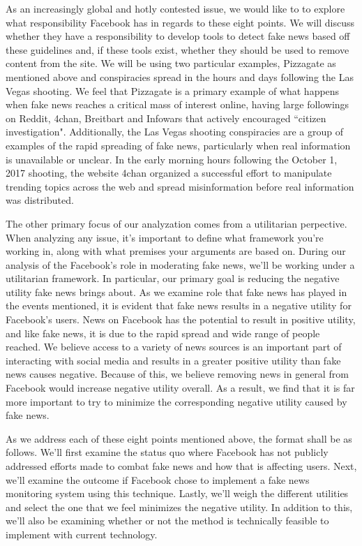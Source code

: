 \documentclass[12pt]{article}
\begin{document}
As an increasingly global and hotly contested issue, we would like to to explore what responsibility Facebook has in regards to these eight points. We will discuss whether they have a responsibility to develop tools to detect fake news based off these guidelines and, if these tools exist, whether they should be used to remove content from the site. We will be using two particular examples, Pizzagate as mentioned above and conspiracies spread in the hours and days following the Las Vegas shooting. We feel that Pizzagate is a primary example of what happens when fake news reaches a critical mass of interest online, having large followings on Reddit, 4chan, Breitbart and Infowars that actively encouraged ``citizen investigation". Additionally, the Las Vegas shooting conspiracies are a group of examples of the rapid spreading of fake news, particularly when real information is unavailable or unclear. In the early morning hours following the October 1, 2017 shooting, the website 4chan organized a successful effort to manipulate trending topics across the web and spread misinformation before real information was distributed.

The other primary focus of our analyzation comes from a utilitarian perpective. When analyzing any issue, it's important to define what framework you're working in, along with what premises your arguments are based on. During our analysis of the Facebook's role in moderating fake news, we'll be working under a utilitarian framework. In particular, our primary goal is reducing the negative utility fake news brings about. As we examine role that fake news has played in the events mentioned, it is evident that fake news results in a negative utility for Facebook's users. News on Facebook has the potential to result in positive utility, and like fake news, it is due to the rapid spread and wide range of people reached. We believe access to a variety of news sources is an important part of interacting with social media and results in a greater positive utility than fake news causes negative. Because of this, we believe removing news in general from Facebook would increase negative utility overall. As a result, we find that it is far more important to try to minimize the corresponding negative utility caused by fake news.

As we address each of these eight points mentioned above, the format shall be as follows. We'll first examine the status quo where Facebook has not publicly addressed efforts made to combat fake news and how that is affecting users. Next, we'll examine the outcome if Facebook chose to implement a fake news monitoring system using this technique. Lastly, we'll weigh the different utilities and select the one that we feel minimizes the negative utility. In addition to this, we'll also be examining whether or not the method is technically feasible to implement with current technology.
\end{document}
